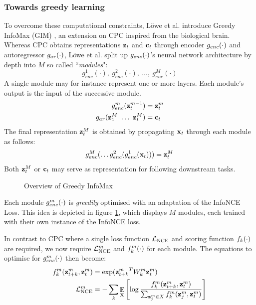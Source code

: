 \subsubsection{Towards greedy learning}	
		To overcome these computational constraints, Löwe et al. introduce Greedy InfoMax (GIM) \cite{lowePuttingEndEndtoEnd2020}, an extension on CPC inspired from the biological brain. Whereas CPC obtains representations $\mathbf{z}_t$ and $\mathbf{c}_t$ through encoder $g_{enc}(\cdot)$ and autoregressor $g_{ar}(\cdot)$, Löwe et al. split up $g_{enc}(\cdot)$'s neural network architecture by depth into $M$ so called ``\textit{modules}": 
		$$g_{enc}^1(\cdot),~ g_{enc}^2(\cdot),~\dots,~g_{enc}^M(\cdot)$$ 
		A single module may for instance represent one or more layers. Each module's output is the input of the successive module.
		\begin{align*} %
			g_{enc}^m(\zt^{m-1}) &= \zt^m \\
			g_{ar}(\z_1^M ~ \dots ~ \zt^M) &= \ct
		\end{align*}
		The final representation $\mathbf{z}_t^M$ is obtained by propagating $\mathbf{x}_t$ through each module as follows:
		$$ g_{enc}^M ( \dots	g_{enc}^2(g_{enc}^1(\mathbf{x}_t))) = \mathbf{z}_t^M $$
		Both $\mathbf{z}_t^M$ or $\mathbf{c}_t$ may serve as representation for following downstream tasks.
	
	\begin{figure}[h!t]
		\hspace{2cm}
		
		\caption{Overview of Greedy InfoMax}
		\label{fig:gim-overview}
	\end{figure}


	
		Each module $g_{enc}^m(\cdot)$ is \textit{greedily} optimised with an adaptation of the InfoNCE Loss. This idea is depicted in figure \ref{fig:gim-overview}, which displays $M$ modules, each trained with their own instance of the InfoNCE loss.
		
		In contrast to CPC where a single loss function $\mathcal{L}_{\text{NCE}}$ and scoring function $f_k(\cdot)$ are required, we now require $\mathcal{L}_{\text{NCE}}^m$ and $f_k^m(\cdot)$ for each module. The equations to optimise for $g_{enc}^m(\cdot)$ then become:
		\begin{align}
			f_k^m(\mathbf{z}_{t+k}^m,\mathbf{z}_t^m) &= \exp({\mathbf{z}_{t+k}^m}^TW_k^m\mathbf{z}_t^m) \label{eq:fkm} \\
			\mathcal{L}_{\text{NCE}}^m &= -\sum_{k} \mathop{\mathbb{E}}_{\substack{\textsubscript{X}}} \left[\log \frac{f_k^m({\mathbf{z}_{t+k}^m},{\mathbf{z}_t^m}) }{\sum_{\mathbf{z}_j^m \in X} f_k^m(\mathbf{z}_j^m, \mathbf{z}_t^m)} \right]	
		\end{align}
	
